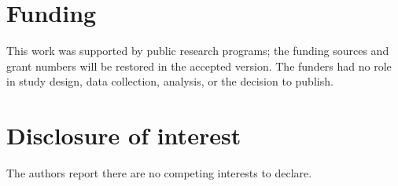\section*{Funding}
\ifdefined\anonymousversion
This work was supported by public research programs; the funding sources and grant numbers will be restored in the accepted version. The funders had no role in study design, data collection, analysis, or the decision to publish.
\else

\fi

\section*{Disclosure of interest}
The authors report there are no competing interests to declare.